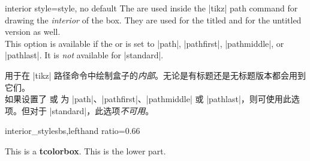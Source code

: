 \begin{docTcbKey}{interior style}{=}{style, no default}
The  are used inside the |tikz| path command
for drawing the \emph{interior} of the box. They are used for the titled
and for the untitled version as well.\\
This option is available if the 
or  is set to
|path|, |pathfirst|, |pathmiddle|, or |pathlast|.
It is \emph{not} available for |standard|.

 用于在 |tikz| 路径命令中绘制盒子的\emph{内部}。无论是有标题还是无标题版本都会用到它们。\\ 如果设置了  或  为 |path|、|pathfirst|、|pathmiddle| 或 |pathlast|，则可使用此选项。但对于 |standard|，此选项\emph{不可用}。
\begin{exdispExample*}{interior_style}{sbs,lefthand ratio=0.66}

\begin{tcolorbox}[enhanced,title=My title,
interior style={left color=red!20!white,
                right color=yellow!50!white}]
This is a \textbf{tcolorbox}.
\tcblower
This is the lower part.
\end{tcolorbox}
\end{exdispExample*}
\end{docTcbKey}

